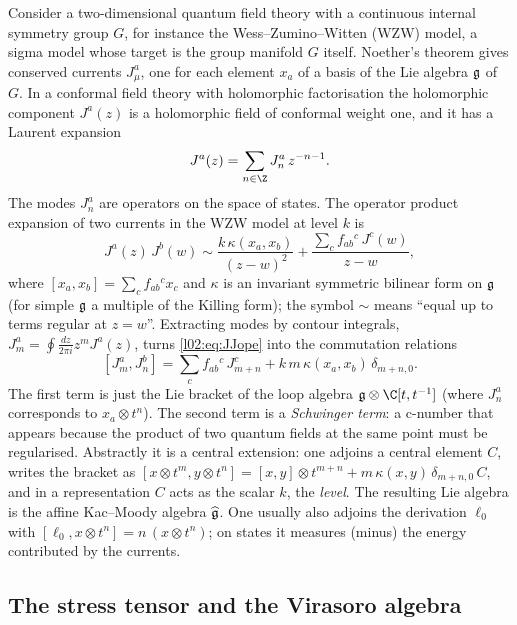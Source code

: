 Consider a two-dimensional quantum field theory with a continuous internal symmetry group $G$, for
instance the Wess--Zumino--Witten (WZW) model, a sigma model whose target is the group manifold
$G$ itself. Noether's theorem gives conserved currents $J^a_\mu$, one for each element $x_a$ of a
basis of the Lie algebra $\mathfrak{g}$ of $G$. In a conformal field theory with holomorphic
factorisation the holomorphic component $J^a(z)$ is a holomorphic field of conformal weight one,
and it has a Laurent expansion
\begin{equation*}
 J^a(z) = \sum_{n\in\Z} J^a_n\, z^{-n-1}.
\end{equation*}
The modes $J^a_n$ are operators on the space of states. The operator product expansion of two
currents in the WZW model at level $k$ is
\begin{equation}\label{l02:eq:JJope}
 J^a(z)\,J^b(w) \sim \frac{k\,\kappa(x_a,x_b)}{(z-w)^2} + \frac{\sum_c f_{ab}{}^c\,J^c(w)}{z-w},
\end{equation}
where $[x_a,x_b] = \sum_c f_{ab}{}^c x_c$ and $\kappa$ is an invariant symmetric bilinear form on
$\mathfrak{g}$ (for simple $\mathfrak{g}$ a multiple of the Killing form); the symbol $\sim$ means ``equal up to terms
regular at $z = w$''. Extracting modes by contour integrals, $J^a_m = \oint\frac{dz}{2\pi i}z^mJ^a(z)$, turns
\eqref{l02:eq:JJope} into the commutation relations
\begin{equation}\label{l02:eq:affinemodes}
 [J^a_m, J^b_n] = \sum_c f_{ab}{}^c\, J^c_{m+n} + k\, m\, \kappa(x_a,x_b)\,\delta_{m+n,0}.
\end{equation}
The first term is just the Lie bracket of the loop algebra $\ltwog\otimes\C[t,t^{-1}]$ (where
$J^a_n$ corresponds to $x_a\otimes t^n$). The second term is a \emph{Schwinger term}: a c-number
that appears because the product of two quantum fields at the same point must be regularised.
Abstractly it is a central extension: one adjoins a central element $C$, writes the bracket as
$[x\otimes t^m, y\otimes t^n] = [x,y]\otimes t^{m+n} + m\,\kappa(x,y)\,\delta_{m+n,0}\,C$, and in
a representation $C$ acts as the scalar $k$, the \emph{level}. The resulting Lie algebra is the
affine Kac--Moody algebra $\widehat{\mathfrak{g}}$. One usually also adjoins the derivation $\ell_0$ with
$[\ell_0, x\otimes t^n] = n\,(x\otimes t^n)$; on states it measures (minus) the energy contributed
by the currents.

\subsection{The stress tensor and the Virasoro algebra}

